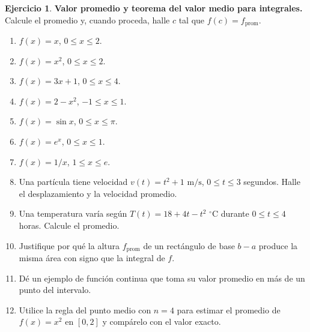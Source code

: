 \documentclass[12pt]{article}
\theoremstyle{definition}
\newtheorem{Ejer}[teorema]{Ejercicio}
\theoremstyle{remark}
\begin{document}
\begin{Ejer}\textbf{Valor promedio y teorema del valor medio para integrales.} Calcule el promedio y, cuando proceda, halle $c$ tal que $f(c)=f_{\mathrm{prom}}$.
\begin{enumerate}[resume=banco3]
\item $f(x)=x$, $0\le x\le2$.
\item $f(x)=x^2$, $0\le x\le2$.
\item $f(x)=3x+1$, $0\le x\le4$.
\item $f(x)=2-x^2$, $-1\le x\le1$.
\item $f(x)=\sin x$, $0\le x\le\pi$.
\item $f(x)=e^x$, $0\le x\le1$.
\item $f(x)=1/x$, $1\le x\le e$.
\item Una partícula tiene velocidad $v(t)=t^2+1$ $\mathrm{m/s}$, $0\le t\le3$ segundos. Halle el desplazamiento y la velocidad promedio.
\item Una temperatura varía según $T(t)=18+4t-t^2$ $^\circ\mathrm C$ durante $0\le t\le4$ horas. Calcule el promedio.
\item Justifique por qué la altura $f_{\mathrm{prom}}$ de un rectángulo de base $b-a$ produce la misma área con signo que la integral de $f$.
\item Dé un ejemplo de función continua que toma su valor promedio en más de un punto del intervalo.
\item Utilice la regla del punto medio con $n=4$ para estimar el promedio de $f(x)=x^2$ en $[0,2]$ y compárelo con el valor exacto.
\end{enumerate}
\end{Ejer}
\end{document}
